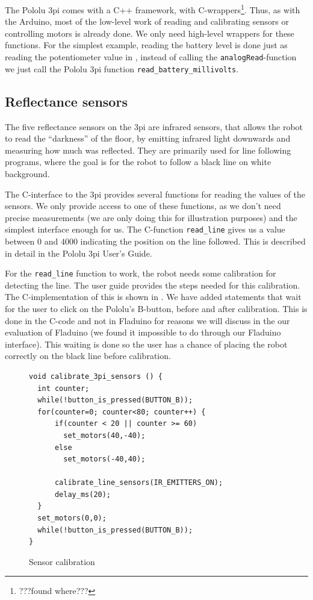 \documentclass[a4paper, oneside, final]{memoir}
\let\fref\undefined
\begin{document}
The Pololu 3pi comes with a C++ framework, with
C-wrappers\footnote{???found where???}. Thus, as with the
Arduino, most of the low-level work of reading and calibrating sensors
or controlling motors is already done. We only need high-level
wrappers for these functions.  For the simplest example, reading the
battery level is done just as reading the potentiometer value in
\fref{sec:potentiometer device}, instead of calling the
\verb|analogRead|-function we just call the Pololu 3pi function
\verb|read_battery_millivolts|. 

\subsection{Reflectance sensors}
The five reflectance sensors on the 3pi are infrared sensors, that
allows the robot to read the ``darkness'' of the floor, by emitting
infrared light downwards and measuring how much was reflected. They
are primarily used for line following programs, where the goal is for
the robot to follow a black line on white background.

The C-interface to the 3pi provides several functions for reading the
values of the sensors. We only provide access to one of these
functions, as we don't need precise measurements (we are only doing
this for illustration purposes) and the simplest interface enough for
us. The C-function \verb|read_line| gives us a value between $0$ and
$4000$ indicating the position on the line followed. This is described
in detail in the Pololu 3pi User's Guide.

For the \verb|read_line| function to work, the robot needs some
calibration for detecting the line. The user guide provides the steps
needed for this calibration. The C-implementation of this is shown in
\fref{fig:sensor calibration}. We have added statements that wait for
the user to click on the Pololu's B-button, before and after
calibration.  This is done in the C-code and not in Fladuino for
reasons we will discuss in the our evaluation of Fladuino (we found it
impossible to do through our Fladuino interface). This waiting is done
so the user has a chance of placing the robot correctly on the black
line before calibration.

\begin{figure}
  \centering
\begin{verbatim}
void calibrate_3pi_sensors () {
  int counter;
  while(!button_is_pressed(BUTTON_B));
  for(counter=0; counter<80; counter++) {
      if(counter < 20 || counter >= 60)
        set_motors(40,-40);
      else
        set_motors(-40,40);

      calibrate_line_sensors(IR_EMITTERS_ON);
      delay_ms(20);
  }
  set_motors(0,0);
  while(!button_is_pressed(BUTTON_B));
}
\end{verbatim}  
  \caption{Sensor calibration}
  \label{fig:sensor calibration}
\end{figure}
\end{document}
